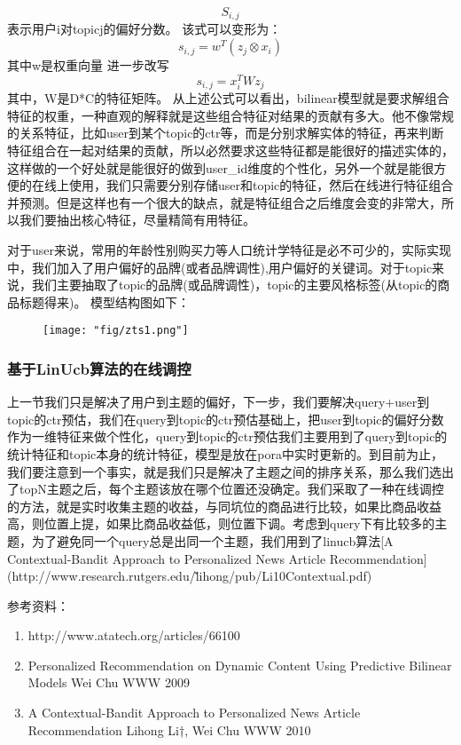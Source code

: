 $$ S_{i,j}$$表示用户i对topicj的偏好分数。
该式可以变形为：
 $$    s_{i,j} = w^T(z_{j} \otimes x_{i}) $$
其中w是权重向量
进一步改写
$$   s_{i,j} = x_{i}^TWz_{j}  $$
其中，W是D*C的特征矩阵。
从上述公式可以看出，bilinear模型就是要求解组合特征的权重，一种直观的解释就是这些组合特征对结果的贡献有多大。他不像常规的关系特征，比如user到某个topic的ctr等，而是分别求解实体的特征，再来判断特征组合在一起对结果的贡献，所以必然要求这些特征都是能很好的描述实体的，这样做的一个好处就是能很好的做到user\_id维度的个性化，另外一个就是能很方便的在线上使用，我们只需要分别存储user和topic的特征，然后在线进行特征组合并预测。但是这样也有一个很大的缺点，就是特征组合之后维度会变的非常大，所以我们要抽出核心特征，尽量精简有用特征。
\par 对于user来说，常用的年龄性别购买力等人口统计学特征是必不可少的，实际实现中，我们加入了用户偏好的品牌(或者品牌调性),用户偏好的关键词。对于topic来说，我们主要抽取了topic的品牌(或品牌调性)，topic的主要风格标签(从topic的商品标题得来)。
模型结构图如下：
\begin{figure}[!h]
	\centering
	\texttt{[image: "fig/zts1.png"]}
	\caption{}
	\label{fig:zts1}
\end{figure}
\subsubsection{基于LinUcb算法的在线调控}
上一节我们只是解决了用户到主题的偏好，下一步，我们要解决query+user到topic的ctr预估，我们在query到topic的ctr预估基础上，把user到topic的偏好分数作为一维特征来做个性化，query到topic的ctr预估我们主要用到了query到topic的统计特征和topic本身的统计特征，模型是放在pora中实时更新的。到目前为止，我们要注意到一个事实，就是我们只是解决了主题之间的排序关系，那么我们选出了topN主题之后，每个主题该放在哪个位置还没确定。我们采取了一种在线调控的方法，就是实时收集主题的收益，与同坑位的商品进行比较，如果比商品收益高，则位置上提，如果比商品收益低，则位置下调。考虑到query下有比较多的主题，为了避免同一个query总是出同一个主题，我们用到了linucb算法[A Contextual-Bandit Approach to Personalized News Article Recommendation](http://www.research.rutgers.edu/\~lihong/pub/Li10Contextual.pdf)

参考资料：
\begin{enumerate}
\item http://www.atatech.org/articles/66100
\item Personalized Recommendation on Dynamic Content Using Predictive Bilinear Models Wei Chu WWW 2009
\item A Contextual-Bandit Approach to Personalized News Article Recommendation Lihong Li†, Wei Chu WWW 2010
\end{enumerate}

